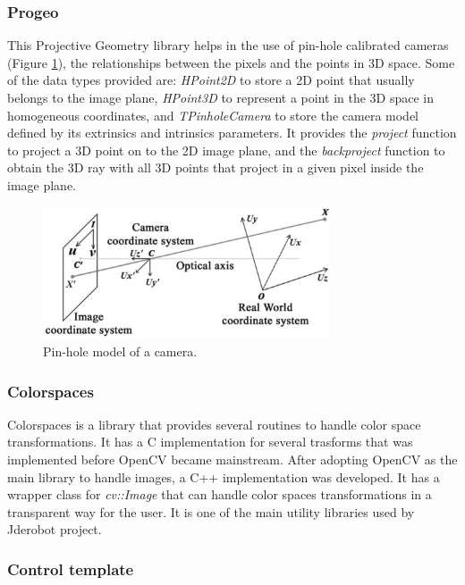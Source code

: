 \documentclass[twocolumn]{svjour3}          %
\begin{document}
\subsubsection{Progeo}
\label{subsec:progeo}

This Projective Geometry library helps in the use of pin-hole calibrated cameras (Figure \ref{fig:pinholemodel}), the relationships between the pixels and the points in 3D space. Some of the data types provided are: \textit{HPoint2D} to store a 2D point that usually belongs to the image plane, \textit{HPoint3D} to represent a point in the 3D space in homogeneous coordinates, and \textit{TPinholeCamera} to store the camera model defined by its extrinsics and intrinsics parameters. It provides the \textit{project} function to project a 3D point on to the 2D image plane, and the \textit{backproject} function to obtain the 3D ray with all 3D points that project in a given pixel inside the image plane.

\begin{figure}[h!]
  \includegraphics[width=8.5cm]{figs/pinholemodel.png}
\caption{Pin-hole model of a camera.}
\label{fig:pinholemodel}
\end{figure}


\subsubsection{Colorspaces}
\label{subsec:colorspaces}
Colorspaces is a library that provides several routines to handle color space transformations. It has a C implementation for several trasforms that was implemented before OpenCV became mainstream. After adopting OpenCV as the main library to handle images, a C++ implementation was developed. It has a wrapper class for \textit{cv::Image} that can handle color spaces transformations in a transparent way for the user. It is one of the main utility libraries used by Jderobot project.

\subsubsection{Control template}
\end{document}
